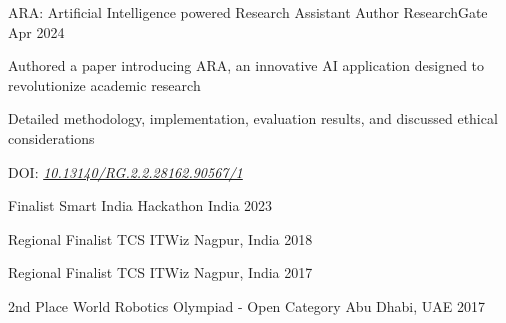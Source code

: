 \documentclass[11pt, a4paper]{awesome-cv}
\begin{document}
\begin{cventries}

  \cventry
  {ARA: Artificial Intelligence powered Research Assistant}
  {Author}
  {ResearchGate}
  {Apr 2024}
  {
    \begin{cvitems}
      \item {Authored a paper introducing ARA, an innovative AI application designed to revolutionize academic research}
      \item {Detailed methodology, implementation, evaluation results, and discussed ethical considerations}
      \item {DOI: \href{http://dx.doi.org/10.13140/RG.2.2.28162.90567/1}{\textit{10.13140/RG.2.2.28162.90567/1}}}
    \end{cvitems}
  }

\end{cventries}












\begin{cvhonors}

  \cvhonor
    {Finalist} %
    {Smart India Hackathon} %
    {India} %
    {2023} %


  \cvhonor
    {Regional Finalist} %
    {TCS ITWiz} %
    {Nagpur, India} %
    {2018} %

  \cvhonor
    {Regional Finalist} %
    {TCS ITWiz} %
    {Nagpur, India} %
    {2017} %

    \cvhonor
    {2nd Place} %
    {World Robotics Olympiad - Open Category} %
    {Abu Dhabi, UAE} %
    {2017} %


\end{cvhonors}
\end{document}
